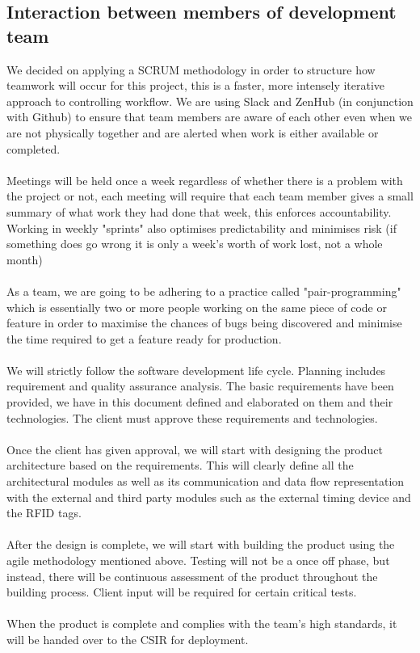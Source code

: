 \documentclass[12pt,a4paper]{article}
\begin{document}
\subsection{Interaction between members of development team}

\textnormal We decided on applying a SCRUM methodology in order to structure how teamwork will occur for
            this project, this is a faster, more intensely iterative approach to controlling workflow.
            We are using Slack and ZenHub (in conjunction with Github) to ensure that team members are aware of each other even when we are not physically together and are alerted when work is either available or completed.
            \\ \\
            Meetings will be held once a week regardless of whether there is a problem with the project or not, each meeting will require that each team member gives a small summary of what work they had done that week, this enforces accountability. Working in weekly "sprints" also optimises predictability and minimises risk (if something does go wrong it is only a week's worth of work lost, not a whole month)
            \\ \\
            As a team, we are going to be adhering to a practice called "pair-programming" which is essentially two or more people working on the same piece of code or feature in order to maximise the chances of bugs being discovered and minimise the time required to get a feature ready for production. \\\\
We will strictly follow the software development life cycle. 
Planning includes requirement and quality assurance analysis.   
The basic requirements have been provided, we have in this document defined and elaborated on them and their technologies. The client must approve these requirements and technologies.  \\\\
Once the client has given approval, we will start with designing the product architecture based on the requirements. This will clearly define all the architectural modules as well as its communication and data flow representation with the external and third party modules such as the external timing device and the RFID tags.  \\\\
After the design is complete, we will start with building the product using the agile methodology mentioned above. 
Testing will not be a once off phase, but instead, there will be continuous assessment of the product throughout the building process. Client input will be required for certain critical tests. \\\\
When the product is complete and complies with the team's high standards, it will be handed over to the CSIR for deployment. 
            \\ \\ 
\end{document}
